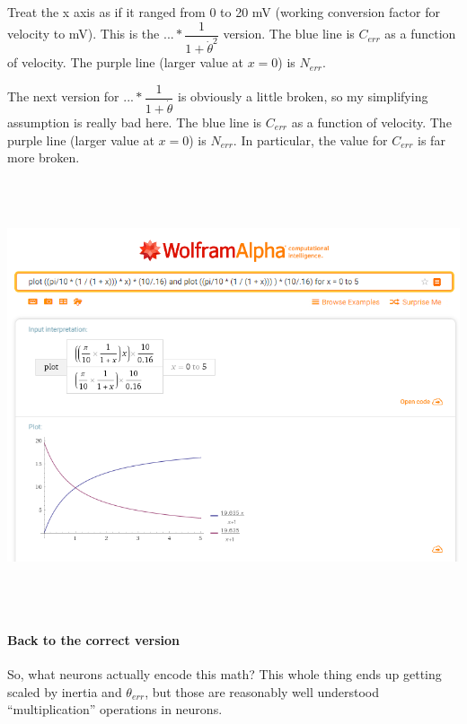 \documentclass[12pt, letterpaper, oneside, notitlepage, onecolumn]{article}
\newcommand{\subsubsubsection}{\paragraph}
\newcommand{\bbssss}[1]{\subsubsubsection{#1}}
\begin{document}
Treat the x axis as if it ranged from 0 to 20 mV (working conversion factor for velocity to mV). This is the $... * \dfrac{1}{1 + \dot{\theta}^{2}}$ version. The blue line is $C_{err}$ as a function of velocity. The purple line (larger value at $x=0$) is $N_{err}$.

The next version for $... * \dfrac{1}{1 + \dot{\theta}}$ is obviously a little broken, so my simplifying assumption is really bad here. The blue line is $C_{err}$ as a function of velocity. The purple line (larger value at $x=0$) is $N_{err}$. In particular, the value for $C_{err}$ is far more broken.

\includegraphics[height=5in, angle=0]{WowThisIsWrong}

\bbssss{Back to the correct version}

So, what neurons actually encode this math? This whole thing ends up getting scaled by inertia and $\theta_{err}$, but those are reasonably well understood ``multiplication'' operations in neurons.
\end{document}
